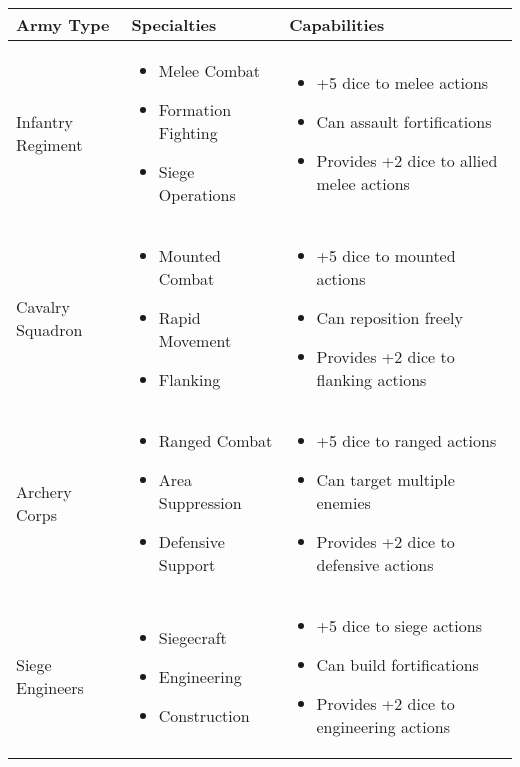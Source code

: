 \documentclass[11pt,letterpaper]{article}
\begin{document}
\begin{longtable}{|>{\raggedright\arraybackslash}p{3cm}|>{\raggedright\arraybackslash}p{4cm}|>{\raggedright\arraybackslash}p{5cm}|}
\hline
\textbf{Army Type} & \textbf{Specialties} & \textbf{Capabilities} \\
\hline
Infantry Regiment & 
\begin{itemize}
    \item Melee Combat
    \item Formation Fighting
    \item Siege Operations
\end{itemize} & 
\begin{itemize}
    \item +5 dice to melee actions
    \item Can assault fortifications
    \item Provides +2 dice to allied melee actions
\end{itemize} \\
\hline
Cavalry Squadron & 
\begin{itemize}
    \item Mounted Combat
    \item Rapid Movement
    \item Flanking
\end{itemize} & 
\begin{itemize}
    \item +5 dice to mounted actions
    \item Can reposition freely
    \item Provides +2 dice to flanking actions
\end{itemize} \\
\hline
Archery Corps & 
\begin{itemize}
    \item Ranged Combat
    \item Area Suppression
    \item Defensive Support
\end{itemize} & 
\begin{itemize}
    \item +5 dice to ranged actions
    \item Can target multiple enemies
    \item Provides +2 dice to defensive actions
\end{itemize} \\
\hline
Siege Engineers & 
\begin{itemize}
    \item Siegecraft
    \item Engineering
    \item Construction
\end{itemize} & 
\begin{itemize}
    \item +5 dice to siege actions
    \item Can build fortifications
    \item Provides +2 dice to engineering actions
\end{itemize} \\
\hline
\end{longtable}
\end{document}
